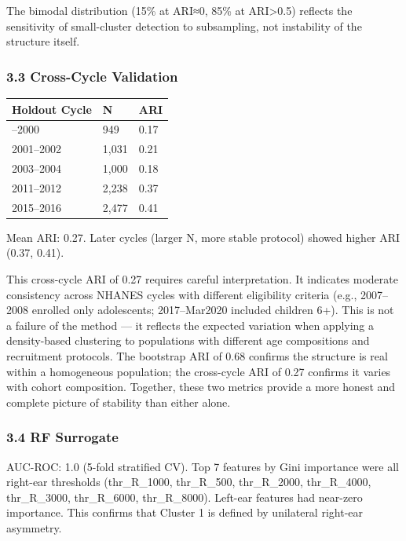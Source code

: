 \documentclass[
]{article}
\newcounter{none} %
\begin{document}
The bimodal distribution (15\% at ARI≈0, 85\% at ARI\textgreater0.5) reflects
the sensitivity of small-cluster detection to subsampling, not instability of
the structure itself.

\subsubsection{3.3 Cross-Cycle Validation}\label{cross-cycle-validation}

{\def\LTcaptype{none} %
\begin{longtable}[]{@{}lll@{}}
\toprule\noalign{}
Holdout Cycle & N & ARI \\
\midrule\noalign{}
\endhead
\bottomrule\noalign{}
\endlastfoot
1999--2000 & 949 & 0.17 \\
2001--2002 & 1,031 & 0.21 \\
2003--2004 & 1,000 & 0.18 \\
2011--2012 & 2,238 & 0.37 \\
2015--2016 & 2,477 & 0.41 \\
\end{longtable}
}

Mean ARI: 0.27. Later cycles (larger N, more stable protocol) showed higher ARI
(0.37, 0.41).

This cross-cycle ARI of 0.27 requires careful interpretation. It indicates
moderate consistency across NHANES cycles with different eligibility criteria
(e.g., 2007--2008 enrolled only adolescents; 2017--Mar2020 included children
6+). This is not a failure of the method --- it reflects the expected variation
when applying a density-based clustering to populations with different age
compositions and recruitment protocols. The bootstrap ARI of 0.68 confirms the
structure is real within a homogeneous population; the cross-cycle ARI of 0.27
confirms it varies with cohort composition. Together, these two metrics provide
a more honest and complete picture of stability than either alone.

\subsubsection{3.4 RF Surrogate}\label{rf-surrogate}

AUC-ROC: 1.0 (5-fold stratified CV). Top 7 features by Gini importance were all
right-ear thresholds (thr\_R\_1000, thr\_R\_500, thr\_R\_2000, thr\_R\_4000,
thr\_R\_3000, thr\_R\_6000, thr\_R\_8000). Left-ear features had near-zero
importance. This confirms that Cluster 1 is defined by unilateral right-ear
asymmetry.
\end{document}
